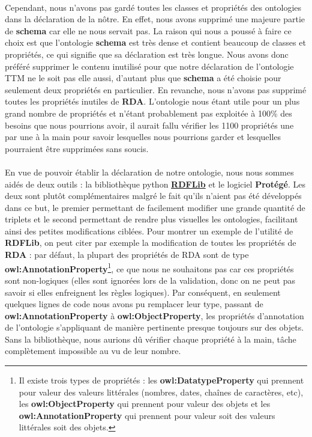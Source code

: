 \paragraph{} \hspace{10mm}
Cependant, nous n'avons pas gardé toutes les classes et propriétés des ontologies dans la déclaration de la nôtre. En effet, nous avons supprimé une majeure partie de \textbf{schema} car elle ne nous servait pas. La raison qui nous a poussé à faire ce choix est que l'ontologie \textbf{schema} est très dense et contient beaucoup de classes et propriétés, ce qui signifie que sa déclaration est très longue. Nous avons donc préféré supprimer le contenu inutilisé pour que notre déclaration de l'ontologie TTM ne le soit pas elle aussi, d'autant plus que \textbf{schema} a été choisie pour seulement deux propriétés en particulier. En revanche, nous n'avons pas supprimé toutes les propriétés inutiles de \textbf{RDA}. L'ontologie nous étant utile pour un plus grand nombre de propriétés et n'étant probablement pas exploitée à 100\% des besoins que nous pourrions avoir, il aurait fallu vérifier les 1100 propriétés une par une à la main pour savoir lesquelles nous pourrions garder et lesquelles pourraient être supprimées sans soucis.

\paragraph{} \hspace{10mm}
En vue de pouvoir établir la déclaration de notre ontologie, nous nous sommes aidés de deux outils : la bibliothèque python \href{https://rdflib.readthedocs.io/en/stable/}{\textbf{RDFLib}} et le logiciel \textbf{Protégé}. Les deux sont plutôt complémentaires malgré le fait qu'ils n'aient pas été développés dans ce but, le premier permettant de facilement modifier une grande quantité de triplets et le second permettant de rendre plus visuelles les ontologies, facilitant ainsi des petites modifications ciblées. Pour montrer un exemple de l'utilité de \textbf{RDFLib}, on peut citer par exemple la modification de toutes les propriétés de \textbf{RDA} : par défaut, la plupart des propriétés de RDA sont de type \textbf{owl:AnnotationProperty}\footnote{Il existe trois types de propriétés : les \textbf{owl:DatatypeProperty} qui prennent pour valeur des valeurs littérales (nombres, dates, chaînes de caractères, etc), les \textbf{owl:ObjectProperty} qui prennent pour valeur des objets et les \textbf{owl:AnnotationProperty} qui prennent pour valeur soit des valeurs littérales soit des objets.}, ce que nous ne souhaitons pas car ces propriétés sont non-logiques (elles sont ignorées lors de la validation, donc on ne peut pas savoir si elles enfreignent les règles logiques). Par conséquent, en seulement quelques lignes de code nous avons pu remplacer leur type, passant de \textbf{owl:AnnotationProperty} à \textbf{owl:ObjectProperty}, les propriétés d'annotation de l'ontologie s'appliquant de manière pertinente presque toujours sur des objets. Sans la bibliothèque, nous aurions dû vérifier chaque propriété à la main, tâche complètement impossible au vu de leur nombre.

